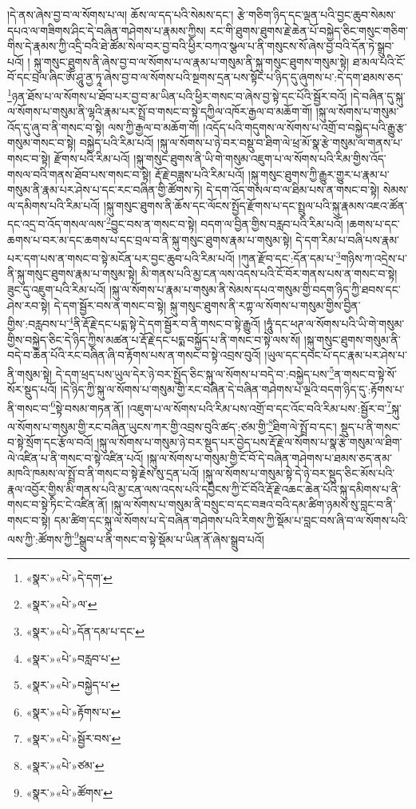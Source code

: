 །དེ་ནས་ཞེས་བྱ་བ་ལ་སོགས་པ་ལ། ཆོས་ལ་དད་པའི་སེམས་དང་། རྩེ་གཅིག་ཉིད་དང་ལྡན་པའི་བྱང་ཆུབ་སེམས་དཔའ་ལ་གཟིགས་ཤིང་དེ་བཞིན་གཤེགས་པ་རྣམས་ཀྱིས། རང་གི་ཐུགས་ཐུགས་རྗེ་ཆེན་པོ་བསྐྱེད་ཅིང་གསུང་གཅིག་གིས་དེ་རྣམས་ཀྱི་འདྲི་བའི་ཐེ་ཚོམ་སེལ་བར་བྱ་བའི་ཕྱིར་བཀའ་སྩལ་པ་ནི་གསུངས་སོ་ཞེས་བྱ་བའི་དོན་ཏེ་སྒྲུབ་པའོ། །
སྐུ་གསུང་ཐུགས་ནི་ཞེས་བྱ་བ་ལ་སོགས་པ་ལ་རྣམ་པ་གསུམ་ནི་སྐུ་གསུང་ཐུགས་གསུམ་སྟེ། ཐ་མལ་པའི་ངོ་བོ་དང་བྲལ་ཞིང་ཨོཾ་ཤཱུ་ནྱ་ཏཱ་ཞེས་བྱ་བ་ལ་སོགས་པའི་སྔགས་དྲན་པས་སྟོང་པ་ཉིད་དུ་ཞུགས་པ་:དེ་དག་ཐམས་ཅད་\footnote{«སྣར་»«པེ་»དེ་དག་}ཉན་ཐོས་པ་ལ་སོགས་པ་ཐོབ་པར་བྱ་བ་མ་ཡིན་པའི་ཕྱིར་གསང་བ་ཞེས་བྱ་སྟེ་དང་པོའི་སྦྱོར་བའོ། །དེ་བཞིན་དུ་སྐུ་ལ་སོགས་པ་གསུམ་ནི་ལྷའི་རྣམ་པར་སྤྲོ་བ་གསང་བ་སྟེ་དཀྱིལ་འཁོར་རྒྱལ་བ་མཆོག་གོ། །སྐུ་ལ་སོགས་པ་གསུམ་འོད་དུ་ཞུ་བ་ནི་གསང་བ་སྟེ། ལས་ཀྱི་རྒྱལ་བ་མཆོག་གོ། །འདོད་པའི་གདུགས་ལ་སོགས་པ་འགྲོ་བ་བསྐྱེད་པའི་རྒྱུ་རྩ་གསུམ་གསང་བ་སྟེ། བསྐྱེད་པའི་རིམ་པའོ། །སྐུ་ལ་སོགས་པ་ཉེ་བར་བསྡུ་བ་ཐིག་ལེ་ཕྲ་མོ་སྣ་རྩེ་གསུམ་ལ་གནས་པ་གསང་བ་སྟེ། རྫོགས་པའི་རིམ་པའོ། །སྐུ་གསུང་ཐུགས་ནི་ཡི་གེ་གསུམ་འཇུག་པ་ལ་སོགས་པའི་རིམ་གྱིས་འོད་གསལ་བའི་གནས་ཐོབ་པས་གསང་བ་སྟེ། རྡོ་རྗེ་བཟླས་པའི་རིམ་པའོ། །སྐུ་གསུང་ཐུགས་ཀྱི་རྒྱུར་གྱུར་པ་རྣམ་པ་གསུམ་ནི་རྣམ་པར་ཤེས་པ་དང་རང་བཞིན་གྱི་ཚོགས་ཏེ། དེ་དག་འོད་གསལ་བ་ལ་ཐིམ་པས་ན་གསང་བ་སྟེ། སེམས་ལ་དམིགས་པའི་རིམ་པའོ། །སྐུ་གསུང་ཐུགས་ནི་ཆོས་དང་ལོངས་སྤྱོད་རྫོགས་པ་དང་སྤྲུལ་པའི་སྐུ་རྣམས་འཇའ་ཚོན་དང་འདྲ་བ་འོད་གསལ་ལས་\footnote{«སྣར་»«པེ་»ལ་}བྱུང་བས་ན་གསང་བ་སྟེ། བདག་ལ་བྱིན་གྱིས་བརླབ་པའི་རིམ་པའོ། །ཆགས་པ་དང་ཆགས་པ་བར་མ་དང་ཆགས་པ་དང་བྲལ་བ་ནི་སྐུ་གསུང་ཐུགས་རྣམ་པ་གསུམ་སྟེ། དེ་དག་རིམ་པ་བཞི་པས་རྣམ་པར་དག་པས་ན་གསང་བ་སྟེ་མངོན་པར་བྱང་ཆུབ་པའི་རིམ་པའོ། །ཀུན་རྫོབ་དང་:དོན་དམ་པ་\footnote{«སྣར་»«པེ་»དོན་དམ་པ་དང་}གཉིས་ཀ་འདྲེས་པ་ནི་སྐུ་གསུང་ཐུགས་རྣམ་པ་གསུམ་སྟེ། མི་གནས་པའི་མྱ་ངན་ལས་འདས་པའི་ངོ་བོར་གནས་པས་ན་གསང་བ་སྟེ། ཟུང་དུ་འཇུག་པའི་རིམ་པའོ། །སྐུ་ལ་སོགས་པ་རྣམ་པ་གསུམ་ནི་སེམས་དཔའ་གསུམ་གྱི་བདག་ཉིད་ཀྱི་ཐབས་དང་ཤེས་རབ་སྟེ། དེ་དག་སྦྱོར་བས་ན་གསང་བ་སྟེ། སྐུ་གསུང་ཐུགས་ནི་རཀྟ་ལ་སོགས་པ་གསུམ་གྱིས་བྱིན་གྱིས་:བརླབས་པ་\footnote{«སྣར་»«པེ་»བརླབ་པ་}ནི་རྡོ་རྗེ་དང་པདྨ་སྟེ་དེ་དག་སྦྱོར་བ་ནི་གསང་བ་སྟེ་རྒྱུའོ། །ཧཱུཾ་དང་ཕཊ་ལ་སོགས་པའི་ཡི་གེ་གསུམ་གྱིས་བསྐྱེད་ཅིང་དེ་ཉིད་ཀྱིས་མཚན་པ་རྡོ་རྗེ་དང་པདྨ་བསྐྱོད་པ་ནི་གསང་བ་སྟེ་ལས་སོ། །སྐུ་གསུང་ཐུགས་གསུམ་ནི་བདེ་བ་ཆེན་པོའི་རང་བཞིན་ཞི་བ་རྟོགས་པས་ན་གསང་བ་སྟེ་འབྲས་བུའོ། །ཡུལ་དང་དབང་པོ་དང་རྣམ་པར་ཤེས་པ་ནི་གསུམ་སྟེ། དེ་དག་ཕྲད་པས་ཡུལ་དེར་ཉེ་བར་སྤྱོད་ཅིང་སྐུ་ལ་སོགས་པ་བདེ་བ་:བསྐྱེད་པས་\footnote{«སྣར་»«པེ་»བསྐྱེད་པ་}ན་གསང་བ་སྟེ་སོ་སོར་སྡུད་པའོ། །དེ་ཉིད་ཀྱི་སྐུ་ལ་སོགས་པ་གསུམ་གྱི་རང་བཞིན་དེ་བཞིན་གཤེགས་པ་ལྔའི་བདག་ཉིད་དུ་:རྟོགས་པ་ནི་གསང་བ་\footnote{«སྣར་»«པེ་»རྟོགས་པ་}སྟེ་བསམ་གཏན་ནོ། །འཇུག་པ་ལ་སོགས་པའི་རིམ་པས་འགྲོ་བ་དང་འོང་བའི་རིམ་པས་:སྦྱོར་བ་\footnote{«སྣར་»«པེ་»སྦྱོར་བས་}སྐུ་ལ་སོགས་པ་གསུམ་གྱི་རང་བཞིན་ཡུངས་ཀར་གྱི་འབྲས་བུའི་ཚད་:ཙམ་གྱི་\footnote{«སྣར་»«པེ་»ཙམ་}ཐིག་ལེ་སྤྲོ་བ་དང་། སྡུད་པ་ནི་གསང་བ་སྟེ་སྲོག་དང་རྩོལ་བའོ། །སྐུ་ལ་སོགས་པ་གསུམ་ཉེ་བར་སྡུད་པར་བྱེད་པས་རྡོ་རྗེ་ལ་སོགས་པ་སྣ་རྩེ་གསུམ་ལ་ཐིག་ལེ་འཛིན་པ་ནི་གསང་བ་སྟེ་འཛིན་པའོ། །སྐུ་ལ་སོགས་པ་གསུམ་གྱི་ངོ་བོ་དེ་བཞིན་གཤེགས་པ་ཐམས་ཅད་ནམ་མཁའི་ཁམས་ལ་སྤྲོ་བ་ནི་གསང་བ་སྟེ་རྗེས་སུ་དྲན་པའོ། །སྐུ་ལ་སོགས་པ་གསུམ་སྟེ་དེ་ཉེ་བར་སྡུད་ཅིང་མོས་པའི་རྣལ་འབྱོར་གྱིས་མི་གནས་པའི་མྱ་ངན་ལས་འདས་པའི་དབྱིངས་ཀྱི་ངོ་བོའི་རྡོ་རྗེ་འཆང་ཆེན་པོའི་སྐུ་དམིགས་པ་ནི་གསང་བ་སྟེ་ཏིང་ངེ་འཛིན་ནོ། །སྐུ་ལ་སོགས་པ་གསུམ་ནི་བསྲུང་བ་དང་བཟའ་བའི་དམ་ཚིག་ཉམས་སུ་བླང་བ་ནི་གསང་བ་སྟེ། དམ་ཚིག་དང་སྐུ་ལ་སོགས་པ་དེ་བཞིན་གཤེགས་པའི་རིགས་ཀྱི་སྡོམ་པ་བླང་བས་ཞི་བ་ལ་སོགས་པའི་ལས་ཀྱི་:ཚོགས་ཀྱི་\footnote{«སྣར་»«པེ་»ཚོགས་}སྒྲུབ་པ་ནི་གསང་བ་སྟེ་སྡོམ་པ་ཡིན་ནོ་ཞེས་སྒྲུབ་པའོ། 